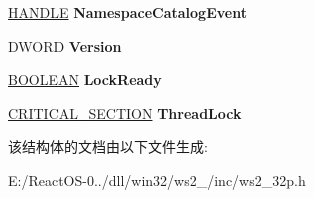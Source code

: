 \begin{DoxyCompactItemize}
\hyperlink{interfacevoid}{H\+A\+N\+D\+LE} {\bfseries Namespace\+Catalog\+Event}
\item 
\mbox{\label{struct___w_s_p_r_o_c_e_s_s_a9f942d077308b133dd60414869f54cd8}} 
D\+W\+O\+RD {\bfseries Version}
\item 
\mbox{\label{struct___w_s_p_r_o_c_e_s_s_ab2ae10f411e4e98e8c5edbcc4b5ada9a}} 
\hyperlink{_processor_bind_8h_a112e3146cb38b6ee95e64d85842e380a}{B\+O\+O\+L\+E\+AN} {\bfseries Lock\+Ready}
\item 
\mbox{\label{struct___w_s_p_r_o_c_e_s_s_a5de06953791808462b76519bf99e4f0f}} 
\hyperlink{struct___c_r_i_t_i_c_a_l___s_e_c_t_i_o_n}{C\+R\+I\+T\+I\+C\+A\+L\+\_\+\+S\+E\+C\+T\+I\+ON} {\bfseries Thread\+Lock}
\end{DoxyCompactItemize}


该结构体的文档由以下文件生成\+:\begin{DoxyCompactItemize}
\item 
E\+:/\+React\+O\+S-\/0../dll/win32/ws2\+\_/inc/ws2\+\_\+32p.\+h\end{DoxyCompactItemize}
